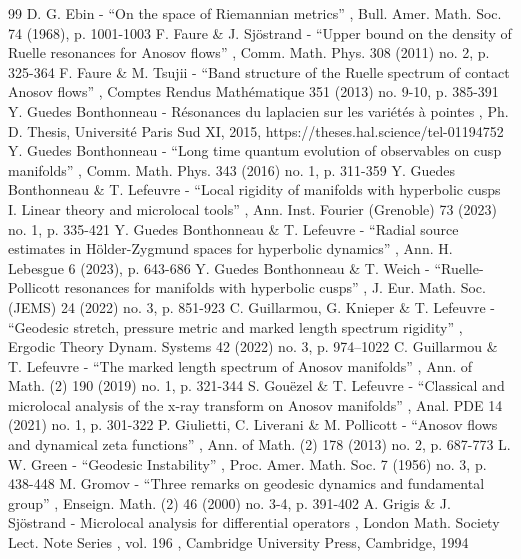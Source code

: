 \begin{thebibliography}{99}
 D. G. Ebin - “On the space of Riemannian metrics” , Bull. Amer. Math. Soc. 74 (1968), p. 1001-1003
 F. Faure \& J. Sjöstrand - “Upper bound on the density of Ruelle resonances for Anosov flows” , Comm. Math. Phys. 308 (2011) no. 2, p. 325-364
 F. Faure \& M. Tsujii - “Band structure of the Ruelle spectrum of contact Anosov flows” , Comptes Rendus Mathématique 351 (2013) no. 9-10, p. 385-391
 Y. Guedes Bonthonneau - Résonances du laplacien sur les variétés à pointes , Ph. D. Thesis, Université Paris Sud XI, 2015, https://theses.hal.science/tel-01194752
 Y. Guedes Bonthonneau - “Long time quantum evolution of observables on cusp manifolds” , Comm. Math. Phys. 343 (2016) no. 1, p. 311-359
 Y. Guedes Bonthonneau \& T. Lefeuvre - “Local rigidity of manifolds with hyperbolic cusps I. Linear theory and microlocal tools” , Ann. Inst. Fourier (Grenoble) 73 (2023) no. 1, p. 335-421
 Y. Guedes Bonthonneau \& T. Lefeuvre - “Radial source estimates in Hölder-Zygmund spaces for hyperbolic dynamics” , Ann. H. Lebesgue 6 (2023), p. 643-686
 Y. Guedes Bonthonneau \& T. Weich - “Ruelle-Pollicott resonances for manifolds with hyperbolic cusps” , J. Eur. Math. Soc. (JEMS) 24 (2022) no. 3, p. 851-923
 C. Guillarmou, G. Knieper \& T. Lefeuvre - “Geodesic stretch, pressure metric and marked length spectrum rigidity” , Ergodic Theory Dynam. Systems 42 (2022) no. 3, p. 974–1022
 C. Guillarmou \& T. Lefeuvre - “The marked length spectrum of Anosov manifolds” , Ann. of Math. (2) 190 (2019) no. 1, p. 321-344
 S. Gouëzel \& T. Lefeuvre - “Classical and microlocal analysis of the x-ray transform on Anosov manifolds” , Anal. PDE 14 (2021) no. 1, p. 301-322
 P. Giulietti, C. Liverani \& M. Pollicott - “Anosov flows and dynamical zeta functions” , Ann. of Math. (2) 178 (2013) no. 2, p. 687-773
 L. W. Green - “Geodesic Instability” , Proc. Amer. Math. Soc. 7 (1956) no. 3, p. 438-448
 M. Gromov - “Three remarks on geodesic dynamics and fundamental group” , Enseign. Math. (2) 46 (2000) no. 3-4, p. 391-402
 A. Grigis \& J. Sjöstrand - Microlocal analysis for differential operators , London Math. Society Lect. Note Series , vol. 196 , Cambridge University Press, Cambridge, 1994

\end{thebibliography}
